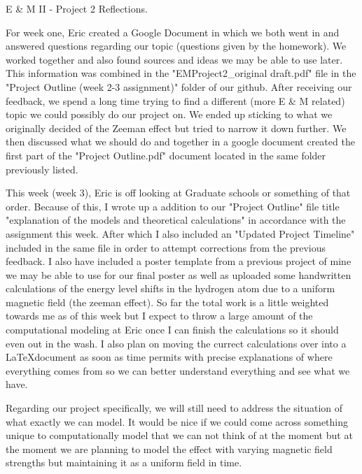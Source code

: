 \documentclass[11pt]{article}
\begin{document}
 

\begin{center}
	{\Large E \& M II - Project 2 Reflections.}
\end{center}

For week one, Eric created a Google Document in which we both went in and answered questions regarding our topic (questions given by the homework). We worked together and also found sources and ideas we may be able to use later. This information was combined in the "EMProject2\_original draft.pdf" file in the "Project Outline (week 2-3 assignment)" folder of our github. After receiving our feedback, we spend a long time trying to find a different (more E \& M related) topic we could possibly do our project on. We ended up sticking to what we originally decided of the Zeeman effect but tried to narrow it down further. We then discussed what we should do and together in a google document created the first part of the "Project Outline.pdf" document located in the same folder previously listed. 

This week (week 3), Eric is off looking at Graduate schools or something of that order. Because of this, I wrote up a addition to our "Project Outline" file title "explanation of the models and theoretical calculations" in accordance with the assignment this week. After which I also included an "Updated Project Timeline" included in the same file in order to attempt corrections from the previous feedback. I also have included a poster template from a previous project of mine we may be able to use for our final poster as well as uploaded some handwritten calculations of the energy level shifts in the hydrogen atom due to a uniform magnetic field (the zeeman effect). So far the total work is a little weighted towards me as of this week but I expect to throw a large amount of the computational modeling at Eric once I can finish the calculations so it should even out in the wash. I also plan on moving the currect calculations over into a \LaTeX document as soon as time permits with precise explanations of where everything comes from so we can better understand everything and see what we have.

Regarding our project specifically, we will still need to address the situation of what exactly we can model. It would be nice if we could come across something unique to computationally model that we can not think of at the moment but at the moment we are planning to model the effect with varying magnetic field strengths but maintaining it as a uniform field in time. 


\end{document}
